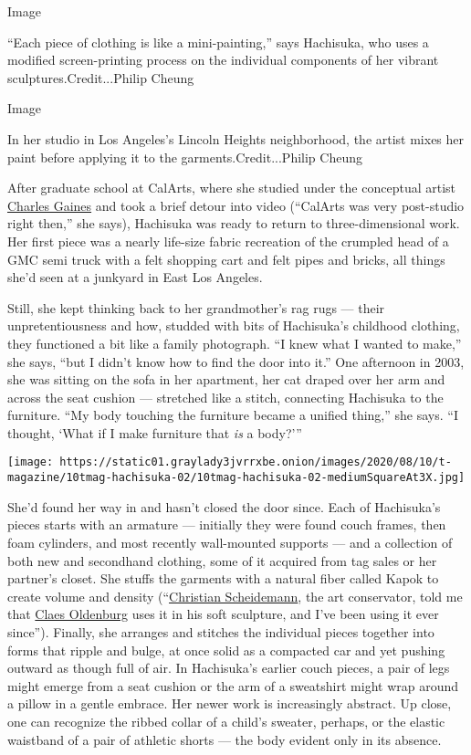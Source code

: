 Image

``Each piece of clothing is like a mini-painting,'' says Hachisuka, who
uses a modified screen-printing process on the individual components of
her vibrant sculptures.Credit...Philip Cheung

Image

In her studio in Los Angeles's Lincoln Heights neighborhood, the artist
mixes her paint before applying it to the garments.Credit...Philip
Cheung

After graduate school at CalArts, where she studied under the conceptual
artist
\href{https://www.nytimes3xbfgragh.onion/2019/04/07/arts/charles-gaines-edward-macdowell-medal.html}{Charles
Gaines} and took a brief detour into video (``CalArts was very
post-studio right then,'' she says), Hachisuka was ready to return to
three-dimensional work. Her first piece was a nearly life-size fabric
recreation of the crumpled head of a GMC semi truck with a felt shopping
cart and felt pipes and bricks, all things she'd seen at a junkyard in
East Los Angeles.

Still, she kept thinking back to her grandmother's rag rugs --- their
unpretentiousness and how, studded with bits of Hachisuka's childhood
clothing, they functioned a bit like a family photograph. ``I knew what
I wanted to make,'' she says, ``but I didn't know how to find the door
into it.'' One afternoon in 2003, she was sitting on the sofa in her
apartment, her cat draped over her arm and across the seat cushion ---
stretched like a stitch, connecting Hachisuka to the furniture. ``My
body touching the furniture became a unified thing,'' she says. ``I
thought, `What if I make furniture that \emph{is} a body?'''

\texttt{[image: https://static01.graylady3jvrrxbe.onion/images/2020/08/10/t-magazine/10tmag-hachisuka-02/10tmag-hachisuka-02-mediumSquareAt3X.jpg]}

She'd found her way in and hasn't closed the door since. Each of
Hachisuka's pieces starts with an armature --- initially they were found
couch frames, then foam cylinders, and most recently wall-mounted
supports --- and a collection of both new and secondhand clothing, some
of it acquired from tag sales or her partner's closet. She stuffs the
garments with a natural fiber called Kapok to create volume and density
(``\href{https://www.newyorker.com/magazine/2009/05/11/the-art-doctor}{Christian
Scheidemann}, the art conservator, told me that
\href{https://www.nytimes3xbfgragh.onion/2017/10/16/t-magazine/claes-oldenburg.html}{Claes
Oldenburg} uses it in his soft sculpture, and I've been using it ever
since''). Finally, she arranges and stitches the individual pieces
together into forms that ripple and bulge, at once solid as a compacted
car and yet pushing outward as though full of air. In Hachisuka's
earlier couch pieces, a pair of legs might emerge from a seat cushion or
the arm of a sweatshirt might wrap around a pillow in a gentle embrace.
Her newer work is increasingly abstract. Up close, one can recognize the
ribbed collar of a child's sweater, perhaps, or the elastic waistband of
a pair of athletic shorts --- the body evident only in its absence.

